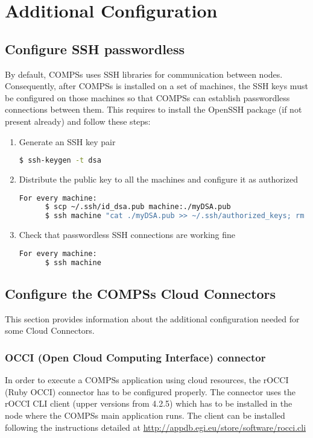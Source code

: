 \section{Additional Configuration}
\label{sec:Additional_Configuration}


\subsection{Configure SSH passwordless}
By default, COMPSs uses SSH libraries for communication between nodes. Consequently, after COMPSs is installed on a set of machines,
the SSH keys must be configured on those machines so that COMPSs can establish passwordless connections between them. This requires
to install the OpenSSH package (if not present already) and follow these steps:
\begin{enumerate}
 \item Generate an SSH key pair
       \begin{lstlisting}[language=bash]
	  $ ssh-keygen -t dsa
       \end{lstlisting}
 \item Distribute the public key to all the machines and configure it as authorized
       \begin{lstlisting}[language=bash]
          For every machine:
	  $ scp ~/.ssh/id_dsa.pub machine:./myDSA.pub
	  $ ssh machine "cat ./myDSA.pub >> ~/.ssh/authorized_keys; rm ./myDSA.pub"
       \end{lstlisting}
 \item Check that passwordless SSH connections are working fine
       \begin{lstlisting}[language=bash]
          For every machine:
	  $ ssh machine
       \end{lstlisting}
\end{enumerate}

\subsection{Configure the COMPSs Cloud Connectors}
This section provides information about the additional configuration needed for some Cloud Connectors.

\subsubsection{OCCI (Open Cloud Computing Interface) connector}
In order to execute a COMPSs application using cloud resources, the rOCCI (Ruby OCCI) connector has to be configured properly.
The connector uses the rOCCI CLI client (upper versions from 4.2.5) which has to be installed in the node where the COMPSs main
application runs. The client can be installed following the instructions detailed at 
\url{http://appdb.egi.eu/store/software/rocci.cli}